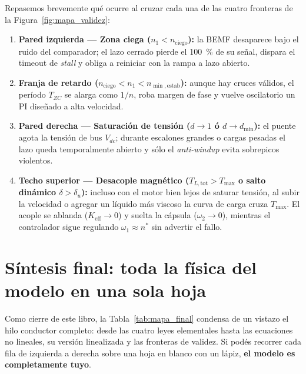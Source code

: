 \documentclass[11pt,a4paper,oneside]{book}
\begin{document}
Repasemos brevemente qué ocurre al cruzar cada una de las cuatro fronteras de la
Figura~\ref{fig:mapa_validez}:
\begin{enumerate}
  \item \textbf{Pared izquierda --- Zona ciega ($n_1 < n_{\text{ciego}}$):} la
        BEMF desaparece bajo el ruido del comparador; el lazo cerrado pierde el
        \SI{100}{\percent} de su señal, dispara el timeout de \emph{stall} y
        obliga a reiniciar con la rampa a lazo abierto.
  \item \textbf{Franja de retardo ($n_{\text{ciego}} < n_1 < n_{\min,\text{estab}}$):}
        aunque hay cruces válidos, el período $T_{ZC}$ se alarga como $1/n$,
        roba margen de fase y vuelve oscilatorio un PI diseñado a alta velocidad.
  \item \textbf{Pared derecha --- Saturación de tensión ($d \to 1$ ó $d \to d_{\min}$):}
        el puente agota la tensión de bus $V_{dc}$; durante escalones grandes o
        cargas pesadas el lazo queda temporalmente abierto y sólo el
        \emph{anti-windup} evita sobrepicos violentos.
  \item \textbf{Techo superior --- Desacople magnético ($T_{L,\text{tot}} > T_{\max}$
        o salto dinámico $\delta > \delta_u$):} incluso con el motor bien lejos
        de saturar tensión, al subir la velocidad o agregar un líquido más
        viscoso la curva de carga cruza $T_{\max}$. El acople se ablanda
        ($K_{\text{eff}} \to 0$) y suelta la cápsula ($\omega_2 \to 0$), mientras
        el controlador sigue regulando $\omega_1 \approx n^\ast$ sin advertir el
        fallo.
\end{enumerate}

\section{Síntesis final: toda la física del modelo en una sola hoja}

Como cierre de este libro, la Tabla~\ref{tab:mapa_final} condensa de un vistazo
el hilo conductor completo: desde las cuatro leyes elementales hasta las
ecuaciones no lineales, su versión linealizada y las fronteras de validez. Si
podés recorrer cada fila de izquierda a derecha sobre una hoja en blanco con un
lápiz, \textbf{el modelo es completamente tuyo}.
\end{document}
